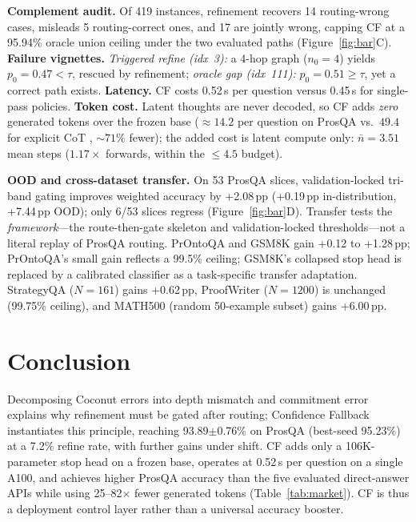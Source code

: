 \documentclass{article}
\theoremstyle{compactthm}
\theoremstyle{compactdef}
\begin{document}
\noindent\textbf{Complement audit.} Of 419 instances, refinement recovers 14 routing-wrong cases, misleads 5 routing-correct ones, and 17 are jointly wrong, capping CF at a 95.94\% oracle union ceiling under the two evaluated paths (Figure~\ref{fig:bar}C). \textbf{Failure vignettes.} \emph{Triggered refine (idx~3):} a 4-hop graph ($n_0{=}4$) yields $p_0{=}0.47<\tau$, rescued by refinement; \emph{oracle gap (idx~111):} $p_0{=}0.51\ge\tau$, yet a correct path exists. \textbf{Latency.} CF costs 0.52\,s per question versus 0.45\,s for single-pass policies. \textbf{Token cost.} Latent thoughts are never decoded, so CF adds \emph{zero} generated tokens over the frozen base (${\approx}14.2$ per question on ProsQA vs.\ $49.4$ for explicit CoT \citep{hao2024coconut}, ${\sim}71\%$ fewer); the added cost is latent compute only: $\bar n{=}3.51$ mean steps ($1.17\times$ forwards, within the ${\le}4.5$ budget).

\textbf{OOD and cross-dataset transfer.} On 53 ProsQA slices, validation-locked tri-band gating improves weighted accuracy by +2.08\,pp (+0.19\,pp in-distribution, +7.44\,pp OOD); only 6/53 slices regress (Figure~\ref{fig:bar}D). Transfer tests the \emph{framework}---the route-then-gate skeleton and validation-locked thresholds---not a literal replay of ProsQA routing. PrOntoQA and GSM8K gain +0.12 to +1.28\,pp; PrOntoQA's small gain reflects a 99.5\% ceiling; GSM8K's collapsed stop head is replaced by a calibrated classifier \citep{cobbe2021training} as a task-specific transfer adaptation. StrategyQA ($N{=}161$) gains +0.62\,pp, ProofWriter ($N{=}1200$) is unchanged (99.75\% ceiling), and MATH500 (random 50-example subset) gains +6.00\,pp.

\section{Conclusion}
\label{sec:concl}
Decomposing Coconut errors into depth mismatch and commitment error explains why refinement must be gated after routing; Confidence Fallback instantiates this principle, reaching 93.89$\pm$0.76\% on ProsQA (best-seed 95.23\%) at a 7.2\% refine rate, with further gains under shift. CF adds only a 106K-parameter stop head on a frozen base, operates at 0.52\,s per question on a single A100, and achieves higher ProsQA accuracy than the five evaluated direct-answer APIs while using 25--82$\times$ fewer generated tokens (Table~\ref{tab:market}). CF is thus a deployment control layer rather than a universal accuracy booster.
\end{document}
